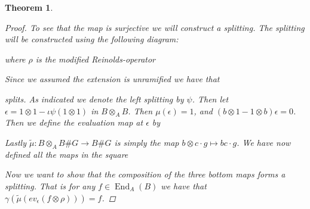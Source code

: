 \documentclass[11pt, a4paper, english]{article}
\numberwithin{prop}{section}
\numberwithin{lemma}{section}
\newtheorem{theorem}{Theorem}
\numberwithin{theorem}{section}
\numberwithin{defin}{section}
\numberwithin{example}{section}
\DeclareMathOperator{\Hom}{Hom}
\DeclareMathOperator{\End}{End}
\begin{document}
\begin{theorem}
\begin{proof}
To see that the map is surjective we will construct a splitting. The splitting will be constructed using the following diagram:
\begin{center}
\end{center}
where $\rho$ is the modified Reinolds-operator
\begin{center}
\end{center}
Since we assumed the extension is unramified we have that
\begin{center}
\end{center}
splits. As indicated we denote the left splitting by $\psi$. Then let $\epsilon = 1 \otimes 1 - \iota\psi(1 \otimes 1)$ in $B \otimes_A B$. Then $\mu(\epsilon) = 1$, and $(b \otimes 1 - 1 \otimes b)\epsilon = 0$. Then we define the evaluation map at $\epsilon$ by
\begin{center}
\end{center}
Lastly $\tilde{\mu}: B \otimes_A B\#G \to B\#G$ is simply the map $b \otimes c \cdot g \mapsto bc \cdot g$. We have now defined all the maps in the square 
\begin{center}
\end{center}
Now we want to show that the composition of the three bottom maps forms a splitting. That is for any $f \in \End_A(B)$ we have that $\gamma(\tilde{\mu}(ev_\epsilon(f \otimes \rho))) = f$.


\end{proof}
\end{theorem}
\end{document}
